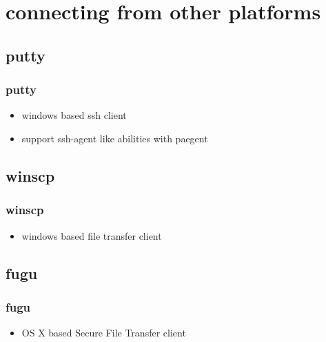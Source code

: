 \documentclass[hyperref={pdfpagelabels=false}]{beamer}
\begin{document}
\section{connecting from other platforms}
\subsection{putty}
\frame
{
    \frametitle{putty}
    \begin{itemize}
    \item{windows based ssh client}
    \item{support ssh-agent like abilities with paegent}
    \end{itemize}
}
\subsection{winscp}
\frame
{
    \frametitle{winscp}
    \begin{itemize}
    \item{windows based file transfer client}
    \end{itemize}
}
\subsection{fugu}
\frame
{
    \frametitle{fugu}
    \begin{itemize}
    \item{OS X based Secure File Transfer client}
    \end{itemize}
}
\end{document}
